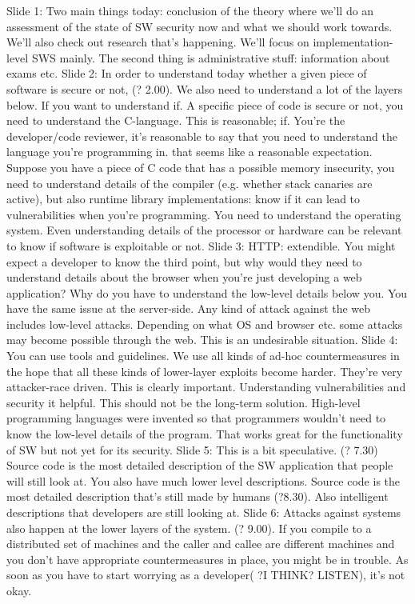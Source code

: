 \documentclass[10pt,a4paper]{report}
\begin{document}
Slide 1: Two main things today: conclusion of the theory where we'll do an assessment of the state of SW security now and what we should work towards. We'll also check out research that's happening. We'll focus on implementation-level SWS mainly. 
The second thing is administrative stuff: information about exams etc.
Slide 2: In order to understand today whether a given piece of software is secure or not, (? 2.00). We also need to understand a lot of the layers below. If you want to understand if. A specific piece of code is secure or not, you need to understand the C-language. This is reasonable; if. You're the developer/code reviewer, it's reasonable to say that you need to understand the language you're programming in. that seems like a reasonable expectation.
Suppose you have a piece of C code that has a possible memory insecurity, you need to understand details of the compiler (e.g. whether stack canaries are active), but also runtime library implementations: know if it can lead to vulnerabilities when you're programming.
You need to understand the operating system. 
Even understanding details of the processor or hardware can be relevant to know if software is exploitable or not. 
Slide 3: HTTP: extendible. You might expect a developer to know the third point, but why would they need to understand details about the browser when you're just developing a web application? Why do you have to understand the low-level details below you. You have the same issue at the server-side.
Any kind of attack against the web includes low-level attacks. Depending on what OS and browser etc. some attacks may become possible through the web. 
This is an undesirable situation.
Slide 4: You can use tools and guidelines.
We use all kinds of ad-hoc countermeasures in the hope that all these kinds of lower-layer exploits become harder. They're very attacker-race driven. This is clearly important. Understanding vulnerabilities and security it helpful. This should not be the long-term solution.
High-level programming languages were invented so that programmers wouldn't need to know the low-level details of the program. That works great for the functionality of SW but not yet for its security.
Slide 5: This is a bit speculative. (? 7.30) Source code is the most detailed description of the SW application that people will still look at. You also have much lower level descriptions. Source code is the most detailed description that's still made by humans (?8.30). Also intelligent descriptions that developers are still looking at.
Slide 6: Attacks against systems also happen at the lower layers of the system. (? 9.00). If you compile to a distributed set of machines and the caller and callee are different machines and you don't have appropriate countermeasures in place, you might be in trouble. As soon as you have to start worrying as a developer( ?I THINK? LISTEN), it's not okay.
\end{document}

